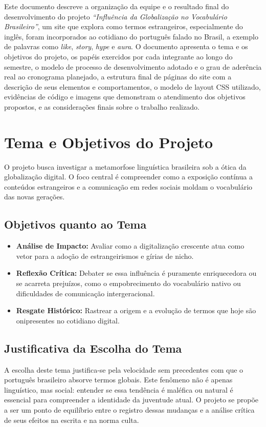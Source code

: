 \documentclass[12pt,a4paper]{article}
\begin{document}
Este documento descreve a organização da equipe e o resultado final do desenvolvimento do
projeto \textit{``Influência da Globalização no Vocabulário Brasileiro''}, um site que explora
como termos estrangeiros, especialmente do inglês, foram incorporados ao cotidiano do português
falado no Brasil, a exemplo de palavras como \textit{like}, \textit{story}, \textit{hype} e
\textit{aura}. O documento apresenta o tema e os objetivos do projeto, os papéis exercidos por
cada integrante ao longo do semestre, o modelo de processo de desenvolvimento adotado e o grau
de aderência real ao cronograma planejado, a estrutura final de páginas do site com a descrição
de seus elementos e comportamentos, o modelo de layout CSS utilizado, evidências de código e
imagens que demonstram o atendimento dos objetivos propostos, e as considerações finais sobre o
trabalho realizado.

\section{Tema e Objetivos do Projeto}

O projeto busca investigar a metamorfose linguística brasileira sob a ótica da globalização
digital. O foco central é compreender como a exposição contínua a conteúdos estrangeiros e a
comunicação em redes sociais moldam o vocabulário das novas gerações.

\subsection{Objetivos quanto ao Tema}
\begin{itemize}[leftmargin=*]
    \item \textbf{Análise de Impacto:} Avaliar como a digitalização crescente atua como vetor
    para a adoção de estrangeirismos e gírias de nicho.
    \item \textbf{Reflexão Crítica:} Debater se essa influência é puramente enriquecedora ou se
    acarreta prejuízos, como o empobrecimento do vocabulário nativo ou dificuldades de
    comunicação intergeracional.
    \item \textbf{Resgate Histórico:} Rastrear a origem e a evolução de termos que hoje são
    onipresentes no cotidiano digital.
\end{itemize}

\subsection{Justificativa da Escolha do Tema}
A escolha deste tema justifica-se pela velocidade sem precedentes com que o português brasileiro
absorve termos globais. Este fenômeno não é apenas linguístico, mas social: entender se essa
tendência é maléfica ou natural é essencial para compreender a identidade da juventude atual. O
projeto se propõe a ser um ponto de equilíbrio entre o registro dessas mudanças e a análise
crítica de seus efeitos na escrita e na norma culta.
\end{document}
